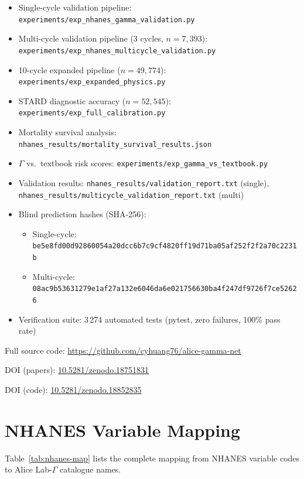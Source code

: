 \documentclass[aps,pre,twocolumn,superscriptaddress,floatfix]{revtex4-2}
\begin{document}
\begin{itemize}
  \item Single-cycle validation pipeline:
    \texttt{experiments/exp\_nhanes\_gamma\_validation.py}
  \item Multi-cycle validation pipeline (3 cycles, $n=7{,}393$):
    \texttt{experiments/exp\_nhanes\_multicycle\_validation.py}
  \item 10-cycle expanded pipeline ($n=49{,}774$):
    \texttt{experiments/exp\_expanded\_physics.py}
  \item STARD diagnostic accuracy ($n=52{,}545$):
    \texttt{experiments/exp\_full\_calibration.py}
  \item Mortality survival analysis:
    \texttt{nhanes\_results/mortality\_survival\_results.json}
  \item $\Gamma$ vs.\ textbook risk scores:
    \texttt{experiments/exp\_gamma\_vs\_textbook.py}
  \item Validation results:
    \texttt{nhanes\_results/validation\_report.txt} (single),
    \texttt{nhanes\_results/multicycle\_validation\_report.txt} (multi)
  \item Blind prediction hashes (SHA-256):
    \begin{itemize}
      \item Single-cycle: \texttt{be5e8fd00d92860054a20dcc6b7c9cf4\-820ff19d71ba05af252f2f2a70c2231b}
      \item Multi-cycle: \texttt{08ac9b53631279e1af27a132e6046da6\-e021756630ba4f247df9726f7ce52626}
    \end{itemize}
  \item Verification suite: 3\,274 automated tests (pytest,
    zero failures, 100\% pass rate)
\end{itemize}

Full source code:
\url{https://github.com/cyhuang76/alice-gamma-net}

DOI (papers):
\href{https://doi.org/10.5281/zenodo.18751831}{10.5281/zenodo.18751831}

DOI (code):
\href{https://doi.org/10.5281/zenodo.18852835}{10.5281/zenodo.18852835}

\section{NHANES Variable Mapping}
\label{app:mapping}

Table~\ref{tab:nhanes-map} lists the complete mapping from
NHANES variable codes to Alice Lab-$\Gamma$ catalogue names.
\end{document}
